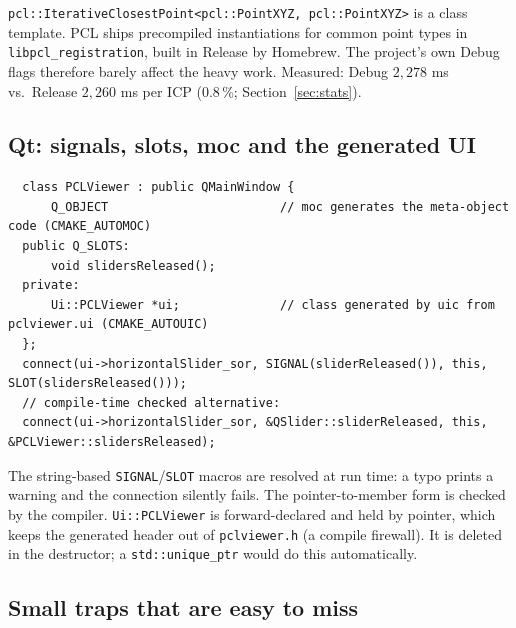\documentclass[10pt,a4paper]{scrartcl}
\renewcommand{\emph}[1]{\textcolor{accent}{#1}}
\newcommand{\code}[1]{\texttt{#1}}
\newcommand{\file}[1]{\texttt{\small #1}}
\begin{document}
  \code{pcl::IterativeClosestPoint<pcl::PointXYZ, pcl::PointXYZ>} is a class template.
  PCL ships \emph{precompiled instantiations} for common point types in
  \code{libpcl\_registration}, built in Release by Homebrew. The project's own Debug
  flags therefore barely affect the heavy work. Measured: Debug $2{,}278$ ms vs.\
  Release $2{,}260$ ms per ICP (0.8\,\%; Section~\ref{sec:stats}).

  \subsection{Qt: signals, slots, moc and the generated UI}

  \begin{lstlisting}
  class PCLViewer : public QMainWindow {
      Q_OBJECT                        // moc generates the meta-object code (CMAKE_AUTOMOC)
  public Q_SLOTS:
      void slidersReleased();
  private:
      Ui::PCLViewer *ui;              // class generated by uic from pclviewer.ui (CMAKE_AUTOUIC)
  };
  connect(ui->horizontalSlider_sor, SIGNAL(sliderReleased()), this, SLOT(slidersReleased()));
  // compile-time checked alternative:
  connect(ui->horizontalSlider_sor, &QSlider::sliderReleased, this, &PCLViewer::slidersReleased);
  \end{lstlisting}
  The string-based \code{SIGNAL}/\code{SLOT} macros are resolved at \emph{run} time:
  a typo prints a warning and the connection silently fails. The pointer-to-member
  form is checked by the compiler. \code{Ui::PCLViewer} is forward-declared and held by
  pointer, which keeps the generated header out of \file{pclviewer.h} (a compile
  firewall). It is deleted in the destructor; a \code{std::unique\_ptr} would do this
  automatically.

  \subsection{Small traps that are easy to miss}
\end{document}
